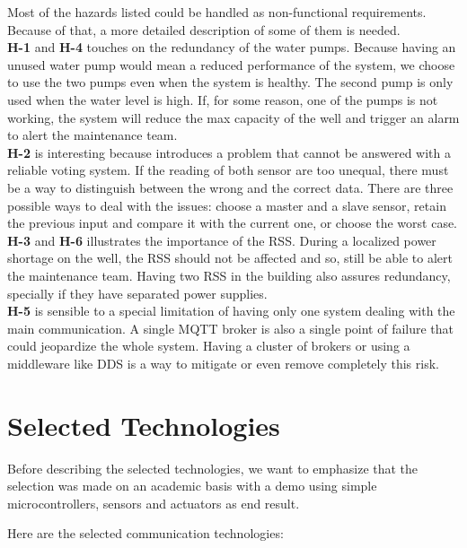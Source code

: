 \documentclass[11pt]{article}
\begin{document}
Most of the hazards listed could be handled as non-functional requirements. Because of that, a more detailed description of some of them is needed.
\\[12pt]
\textbf{H-1} and \textbf{H-4} touches on the redundancy of the water pumps. Because having an unused water pump would mean a reduced performance of the system, we choose to use the two pumps even when the system is healthy. The second pump is only used when the water level is high. If, for some reason, one of the pumps is not working, the system will reduce the max capacity of the well and trigger an alarm to alert the maintenance team.
\\[12pt]
\textbf{H-2} is interesting because introduces a problem that cannot be answered with a reliable voting system. If the reading of both sensor are too unequal, there must be a way to distinguish between the wrong and the correct data. There are three possible ways to deal with the issues: choose a master and a slave sensor, retain the previous input and compare it with the current one, or choose the worst case.
\\[12pt]
\textbf{H-3} and \textbf{H-6} illustrates the importance of the RSS. During a localized power shortage on the well, the RSS should not be affected and so, still be able to alert the maintenance team. Having two RSS in the building also assures redundancy, specially if they have separated power supplies.
\\[12pt]
\textbf{H-5} is sensible to a special limitation of having only one system dealing with the main communication. A single MQTT broker is also a single point of failure that could jeopardize the whole system. Having a cluster of brokers or using a middleware like DDS is a way to mitigate or even remove completely this risk.

\newpage
\section{Selected Technologies}

Before describing the selected technologies, we want to emphasize that the selection was made on an academic basis with a demo using simple microcontrollers, sensors and actuators as end result.

Here are the selected communication technologies:
\end{document}
